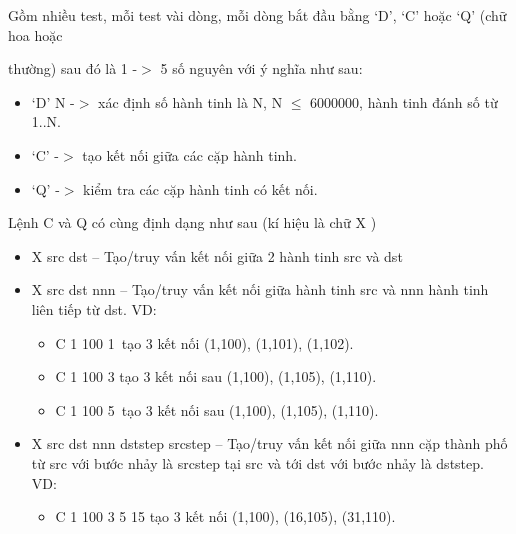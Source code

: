 Gồm nhiều test, mỗi test vài dòng, mỗi dòng bắt đầu bằng ‘D’, ‘C’ hoặc ‘Q’ (chữ hoa hoặc

thường) sau đó là 1 -$>$ 5 số nguyên với ý nghĩa như sau:
\begin{itemize}
	\item ‘D’ N -$>$ xác định số hành tinh là N, N $\le$ 6000000, hành tinh đánh số từ 1..N.
	\item ‘C’ -$>$ tạo kết nối giữa các cặp hành tinh.
	\item ‘Q’ -$>$ kiểm tra các cặp hành tinh có kết nối.
\end{itemize}

Lệnh C và Q có cùng định dạng như sau (kí hiệu là chữ X )
\begin{itemize}
	\item X src dst – Tạo/truy vấn kết nối giữa 2 hành tinh src và dst
	\item X src dst nnn – Tạo/truy vấn kết nối giữa hành tinh src và nnn hành tinh liên tiếp từ dst. VD:
\begin{itemize}
	\item C 1 100 1 tạo 3 kết nối (1,100), (1,101), (1,102).
	\item C 1 100 3 tạo 3 kết nối sau (1,100), (1,105), (1,110).
	\item C 1 100 5 tạo 3 kết nối sau (1,100), (1,105), (1,110).
\end{itemize}
	\item X src dst nnn dststep srcstep – Tạo/truy vấn kết nối giữa nnn cặp thành phố từ src với bước nhảy là srcstep tại src và tới dst với bước nhảy là dststep. VD:
\begin{itemize}
	\item C 1 100 3 5 15 tạo 3 kết nối (1,100), (16,105), (31,110).
\end{itemize}
\end{itemize}

\